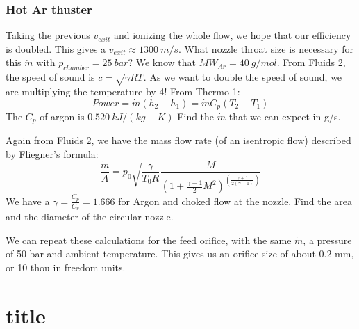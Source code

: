             \subsubsection{Hot Ar thuster}
            Taking the previous $v_{exit}$ and ionizing the whole flow, we hope that our efficiency is doubled. This gives a $v_{exit}\approx 1300\:m/s$. What nozzle throat size is necessary for this $\dot m$ with $p_{chamber} = 25\: bar$? We know that $MW_{Ar} = 40 \: g/mol$. From Fluids 2, the speed of sound is $c = \sqrt{\gamma R T}$. As we want to double the speed of sound, we are multiplying the temperature by 4! From Thermo 1:
            \[Power = \dot m (h_2-h_1)
            = \dot m C_p (T_2-T_1)\]
            The $C_p$ of argon is $0.520\:kJ/(kg-K)$ Find the $\dot m$ that we can expect in g/s.\vspace{60mm}
            
            Again from Fluids 2, we have the mass flow rate (of an isentropic flow) described by Fliegner's formula:
            \[\frac{\dot m}{A} = p_0\sqrt{\frac{\gamma}{T_0 R}}\frac{M}{(1+\frac{\gamma-1}{2}M^2)^{(\frac{\gamma+1}{2(\gamma-1)})}}\]
            We have a $\gamma = \frac{C_p}{C_v} = 1.666$ for Argon and choked flow at the nozzle. Find the area and the diameter of the circular nozzle.\vspace{170 mm}
            
            We can repeat these calculations for the feed orifice, with the same $\dot m$, a pressure of 50 bar and ambient temperature. This gives us an orifice size of about 0.2 mm, or 10 thou in freedom units.

    
    \section{title}
